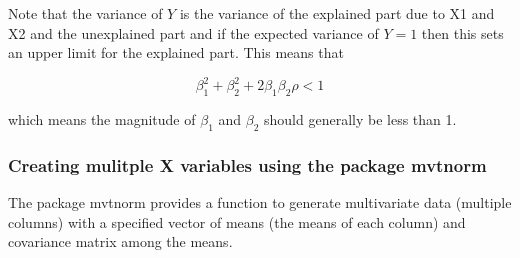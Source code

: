 \documentclass[]{book}
\newenvironment{Shaded}{\begin{snugshade}}{\end{snugshade}}
\newcommand{\KeywordTok}[1]{\textcolor[rgb]{0.13,0.29,0.53}{\textbf{#1}}}
\newcommand{\DataTypeTok}[1]{\textcolor[rgb]{0.13,0.29,0.53}{#1}}
\newcommand{\DecValTok}[1]{\textcolor[rgb]{0.00,0.00,0.81}{#1}}
\newcommand{\FloatTok}[1]{\textcolor[rgb]{0.00,0.00,0.81}{#1}}
\newcommand{\StringTok}[1]{\textcolor[rgb]{0.31,0.60,0.02}{#1}}
\newcommand{\CommentTok}[1]{\textcolor[rgb]{0.56,0.35,0.01}{\textit{#1}}}
\newcommand{\OtherTok}[1]{\textcolor[rgb]{0.56,0.35,0.01}{#1}}
\newcommand{\ControlFlowTok}[1]{\textcolor[rgb]{0.13,0.29,0.53}{\textbf{#1}}}
\newcommand{\OperatorTok}[1]{\textcolor[rgb]{0.81,0.36,0.00}{\textbf{#1}}}
\newcommand{\NormalTok}[1]{#1}
\begin{document}
Note that the variance of \(Y\) is the variance of the explained part
due to X1 and X2 and the unexplained part and if the expected variance
of \(Y=1\) then this sets an upper limit for the explained part. This
means that

\begin{equation}
\beta_1^2 + \beta_2^2 + 2 \beta_1 \beta_2 \rho < 1
\end{equation}

which means the magnitude of \(\beta_1\) and \(\beta_2\) should
generally be less than 1.

\subsubsection{Creating mulitple X variables using the package
mvtnorm}\label{creating-mulitple-x-variables-using-the-package-mvtnorm}

The package mvtnorm provides a function to generate multivariate data
(multiple columns) with a specified vector of means (the means of each
column) and covariance matrix among the means.

\begin{Shaded}
\end{Shaded}
\end{document}
